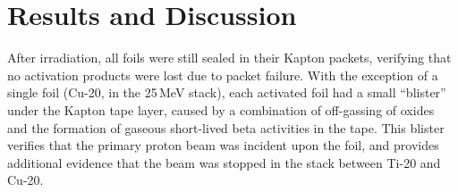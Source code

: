 \section{\label{sec:results_fe}Results and Discussion}



After irradiation, all foils were 
still sealed in their Kapton packets, verifying that no activation products were lost due to packet failure.
With the exception of a single foil (Cu-20, in the 25\,MeV stack), each activated foil had a small \enquote{blister} under the Kapton tape layer, caused by a combination of 
off-gassing of oxides and the formation of gaseous short-lived beta activities in the tape.
This blister   verifies that the primary proton beam was incident upon the foil, and provides additional 
evidence 
that the beam was stopped in the stack between Ti-20 and Cu-20.
